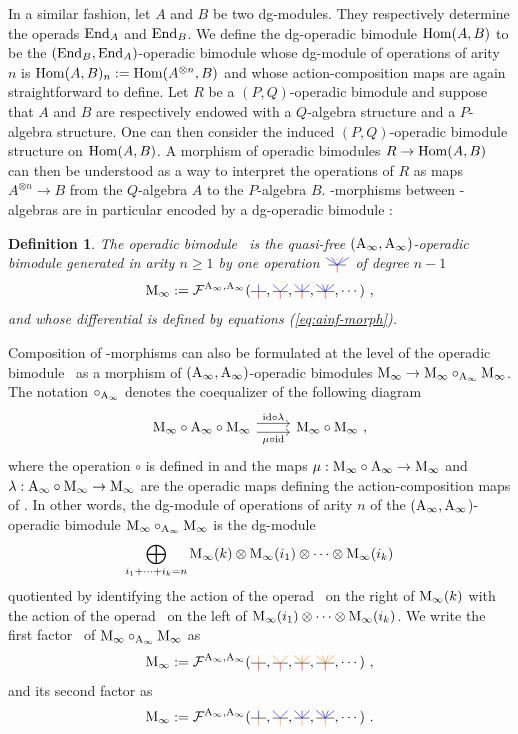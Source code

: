 \documentclass[twoside, 12pt]{amsart}
\newtheorem{definition}{Definition}[section]
\theoremstyle{remark}
\begin{document}
In a similar fashion, let $A$ and $B$ be two dg-modules. They respectively determine the operads $\mathrm{End}_A$ and $ \mathrm{End}_B$. We define the dg-operadic bimodule $\mathrm{Hom} (A ,B)$ to be the $(\mathrm{End}_B , \mathrm{End}_A)$-operadic bimodule whose dg-module of operations of arity $n$ is $ \mathrm{Hom} (A ,B)_n := \mathrm{Hom} (A^{\otimes n},B)$ and whose action-composition maps are again straightforward to define.
Let $R$ be a $(P,Q)$-operadic bimodule and suppose that $A$ and $B$ are respectively endowed with a $Q$-algebra structure and a $P$-algebra structure. One can then consider the induced $(P,Q)$-operadic bimodule structure on $\mathrm{Hom} (A ,B)$. A morphism of operadic bimodules $R \rightarrow \mathrm{Hom} (A ,B)$ can then be understood as a way to interpret the operations of $R$ as maps $A^{\otimes n} \rightarrow B$ from the $Q$-algebra $A$ to the $P$-algebra $B$. \Ainf -morphisms between \Ainf -algebras are in particular encoded by a dg-operadic bimodule :

\begin{definition}
The operadic bimodule \Minf\ is the quasi-free $(\mathrm{A}_\infty ,\mathrm{A}_\infty )$-operadic bimodule generated in arity $n \geqslant 1$ by one operation $\arbreopmorph{0.15}$ of degree $n-1$ 
\[ \Minf :=  \mathcal{F}^{\Ainf , \Ainf}(\arbreopunmorph , \arbreopdeuxmorph , \arbreoptroismorph , \arbreopquatremorph , \cdots ) \ , \]
and whose differential is defined by equations (\ref{eq:ainf-morph}).
\end{definition}

Composition of \Ainf -morphisms can also be formulated at the level of the operadic bimodule \Minf\ as a morphism of $(\mathrm{A}_\infty , \mathrm{A}_\infty)$-operadic bimodules $\mathrm{M}_\infty \rightarrow \mathrm{M}_\infty \circ_{\mathrm{A}_\infty} \mathrm{M}_\infty$.
The notation $\circ_{\mathrm{A}_\infty}$ denotes the coequalizer of the following diagram
\[ \begin{tikzcd}
\Minf \circ \Ainf \circ \Minf \ar[r,shift left=.75ex,"\ide \circ \lambda"] \ar[r,shift right=.75ex,swap,"\mu \circ \ide"] & \Minf \circ \Minf \ ,
\end{tikzcd} \]
where the operation $\circ$ is defined in \cite[Chapter 5]{LodayVallette12} and the maps $\mu : \mathrm{M}_\infty \circ \mathrm{A}_\infty \rightarrow \mathrm{M}_\infty$ and $\lambda : \mathrm{A}_\infty \circ \mathrm{M}_\infty \rightarrow \mathrm{M}_\infty$ are the operadic maps defining the action-composition maps of \Minf .
In other words, the dg-module of operations of arity $n$ of the $(\mathrm{A}_\infty ,\mathrm{A}_\infty$)-operadic bimodule $\mathrm{M}_\infty \circ_{\mathrm{A}_\infty} \mathrm{M}_\infty$ is the dg-module
\[ \bigoplus_{i_1 + \cdots + i_k = n} \mathrm{M}_\infty (k) \otimes \mathrm{M}_\infty (i_1) \otimes \cdots \otimes \mathrm{M}_\infty (i_k) \]
quotiented by identifying the action of the operad \Ainf\ on the right of $\mathrm{M}_\infty (k)$ with the action of the operad \Ainf\ on the left of $\mathrm{M}_\infty (i_1) \otimes \cdots \otimes \mathrm{M}_\infty (i_k)$. 
We write the first factor \Minf\ of $\mathrm{M}_\infty \circ_{\mathrm{A}_\infty} \mathrm{M}_\infty$ as
\[ \Minf :=  \mathcal{F}^{\Ainf , \Ainf}(\arbreopunmorphcompdeux , \arbreopdeuxmorphcompdeux , \arbreoptroismorphcompdeux , \arbreopquatremorphcompdeux , \cdots ) \ , \]
and its second factor as
\[ \Minf :=  \mathcal{F}^{\Ainf , \Ainf}(\arbreopunmorphcompun , \arbreopdeuxmorphcompun , \arbreoptroismorphcompun , \arbreopquatremorphcompun , \cdots ) \ . \]
\end{document}
